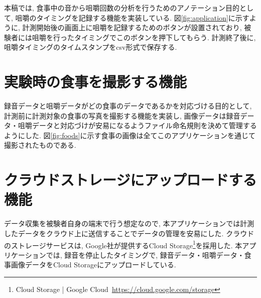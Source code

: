 本稿では, 食事中の音から咀嚼回数の分析を行うためのアノテーション目的として, 咀嚼のタイミングを記録する機能を実装している. 図\ref{fig:application}に示すように, 計測開始後の画面上に咀嚼を記録するためのボタンが設置されており, 被験者には咀嚼を行ったタイミングでこのボタンを押下してもらう. 計測終了後に, 咀嚼タイミングのタイムスタンプをcsv形式で保存する.

\section{実験時の食事を撮影する機能}

録音データと咀嚼データがどの食事のデータであるかを対応づける目的として, 計測前に計測対象の食事の写真を撮影する機能を実装し, 画像データは録音データ・咀嚼データと対応づけが安易になるようファイル命名規則を決めて管理するようにした. 図\ref{fig:foods}に示す食事の画像は全てこのアプリケーションを通じて撮影されたものである.

\section{クラウドストレージにアップロードする機能}

データ収集を被験者自身の端末で行う想定なので, 本アプリケーションでは計測したデータをクラウド上に送信することでデータの管理を安易にした. クラウドのストレージサービスは, Google社が提供するCloud Storage\footnote{Cloud Storage | Google Cloud~\url{https://cloud.google.com/storage}}を採用した. 本アプリケーションでは, 録音を停止したタイミングで, 録音データ・咀嚼データ・食事画像データをCloud Storageにアップロードしている.

